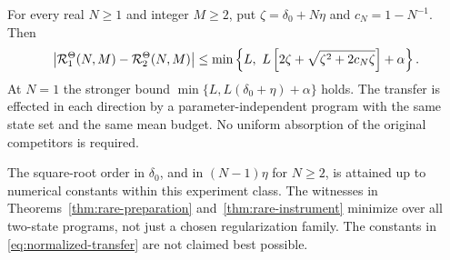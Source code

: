 \begin{theorem}\label{thm:normalized-transfer}
For every real $N\ge1$ and integer $M\ge2$, put
$\zeta=\delta_0+N\eta$ and $c_N=1-N^{-1}$. Then
\begin{equation}\label{eq:normalized-transfer}
 \left|\mathcal R_1^\Theta(N,M)-\mathcal R_2^\Theta(N,M)\right|
 \le \min\left\{L,\ L\left[2\zeta+
          \sqrt{\zeta^2+2c_N\zeta}\right]+\alpha\right\}.
\end{equation}
At $N=1$ the stronger bound $\min\{L,L(\delta_0+\eta)+\alpha\}$ holds. The transfer is effected in each direction by a parameter-independent program with the same state set and the same mean budget. No uniform absorption of the original competitors is required.

The square-root order in $\delta_0$, and in $(N-1)\eta$ for $N\ge2$, is attained up to numerical constants within this experiment class. The witnesses in Theorems~\ref{thm:rare-preparation} and~\ref{thm:rare-instrument} minimize over all two-state programs, not just a chosen regularization family. The constants in \eqref{eq:normalized-transfer} are not claimed best possible.
\end{theorem}
